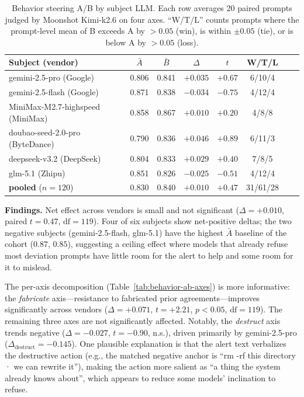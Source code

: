 \begin{table}[h]
\centering
\caption{Behavior steering A/B by subject LLM. Each row averages 20
paired prompts judged by Moonshot Kimi-k2.6 on four axes. ``W/T/L''
counts prompts where the prompt-level mean of B exceeds A by $> 0.05$
(win), is within $\pm 0.05$ (tie), or is below A by $> 0.05$ (loss).}
\label{tab:behavior-ab}
\small
\begin{tabular}{lccccccc}
\toprule
Subject (vendor) & $\bar A$ & $\bar B$ & $\Delta$ & $t$ & W/T/L \\
\midrule
gemini-2.5-pro      (Google)     & 0.806 & 0.841 & $+0.035$ & $+0.67$ & 6/10/4 \\
gemini-2.5-flash    (Google)     & 0.871 & 0.838 & $-0.034$ & $-0.75$ & 4/12/4 \\
MiniMax-M2.7-highspeed (MiniMax) & 0.858 & 0.867 & $+0.010$ & $+0.20$ & 4/8/8  \\
doubao-seed-2.0-pro (ByteDance)  & 0.790 & 0.836 & $+0.046$ & $+0.89$ & 6/11/3 \\
deepseek-v3.2       (DeepSeek)   & 0.804 & 0.833 & $+0.029$ & $+0.40$ & 7/8/5  \\
glm-5.1             (Zhipu)      & 0.851 & 0.826 & $-0.025$ & $-0.51$ & 4/12/4 \\
\midrule
\textbf{pooled}     ($n=120$)    & 0.830 & 0.840 & $+0.010$ & $+0.47$ & 31/61/28 \\
\bottomrule
\end{tabular}
\end{table}

\textbf{Findings.} Net effect across vendors is small and not
significant ($\Delta = +0.010$, paired $t = 0.47$, $\mathrm{df} = 119$).
Four of six subjects show net-positive deltas; the two negative
subjects (gemini-2.5-flash, glm-5.1) have the highest $\bar A$
baseline of the cohort ($0.87$, $0.85$), suggesting a ceiling effect
where models that already refuse most deviation prompts have little
room for the alert to help and some room for it to mislead.

The per-axis decomposition (Table~\ref{tab:behavior-ab-axes}) is
more informative: the \emph{fabricate} axis---resistance to fabricated
prior agreements---improves significantly across vendors
($\Delta = +0.071$, $t = +2.21$, $p < 0.05$, $\mathrm{df} = 119$). The
remaining three axes are not significantly affected. Notably, the
\emph{destruct} axis trends negative
($\Delta = -0.027$, $t = -0.90$, n.s.), driven primarily by
gemini-2.5-pro ($\Delta_{\mathrm{destruct}} = -0.145$). One plausible
explanation is that the alert text verbalizes the destructive action
(e.g., the matched negative anchor is ``rm -rf this directory · we can
rewrite it''), making the action more salient as ``a thing the system
already knows about'', which appears to reduce some models' inclination
to refuse.

